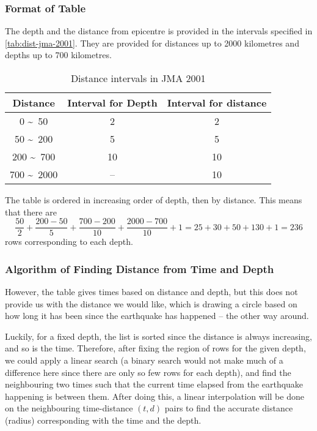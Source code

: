\subsubsection{Format of Table}

The depth and the distance from epicentre is provided in the intervals specified in \autoref{tab:dist-jma-2001}. They are provided for distances up to 2000 kilometres and depths up to 700 kilometres.

\begin{table}[htp]
    \centering

    \begin{tabular}{ccc}
        Distance                  & Interval for Depth & Interval for distance \\
        \hline
        0 \textasciitilde\ 50     & 2                  & 2                     \\
        50 \textasciitilde\ 200   & 5                  & 5                     \\
        200 \textasciitilde\ 700  & 10                 & 10                    \\
        700 \textasciitilde\ 2000 & --                 & 10
    \end{tabular}
    \caption{Distance intervals in JMA 2001}
    \label{tab:dist-jma-2001}
\end{table}

The table is ordered in increasing order of depth, then by distance. This means that there are
\[
    \frac{50}{2} + \frac{200 - 50}{5} + \frac{700 - 200}{10} + \frac{2000 - 700}{10} + 1 = 25 + 30 + 50 + 130 + 1 = 236
\]
rows corresponding to each depth.

\subsubsection{Algorithm of Finding Distance from Time and Depth}

However, the table gives times based on distance and depth, but this does not provide us with the distance we would like, which is drawing a circle based on how long it has been since the earthquake has happened -- the other way around.

Luckily, for a fixed depth, the list is sorted since the distance is always increasing, and so is the time. Therefore, after fixing the region of rows for the given depth, we could apply a linear search (a binary search would not make much of a difference here since there are only so few rows for each depth), and find the neighbouring two times such that the current time elapsed from the earthquake happening is between them. After doing this, a linear interpolation will be done on the neighbouring time-distance \((t, d)\) pairs to find the accurate distance (radius) corresponding with the time and the depth.

